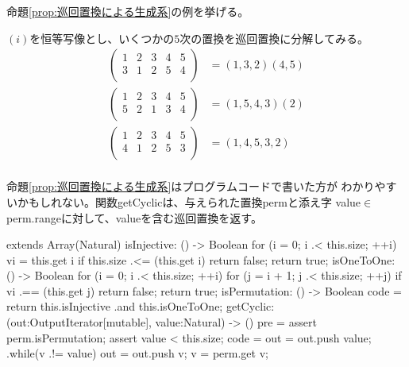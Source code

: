	命題\ref{prop:巡回置換による生成系}の例を挙げる。

	\begin{example}[巡回置換による分解の例]\label{eg:巡回置換による分解の例} %
		$(i)$を恒等写像とし、いくつかの$5$次の置換を巡回置換に分解してみる。
		\begin{equation*}\begin{split} %
			\begin{pmatrix}
				1 & 2 & 3 & 4 & 5 \\
				3 & 1 & 2 & 5 & 4 \\
			\end{pmatrix} &= (1,3,2)(4,5) \\
			\begin{pmatrix}
				1 & 2 & 3 & 4 & 5 \\
				5 & 2 & 1 & 3 & 4 \\
			\end{pmatrix} &= (1,5,4,3)(2) \\
			\begin{pmatrix}
				1 & 2 & 3 & 4 & 5 \\
				4 & 1 & 2 & 5 & 3 \\
			\end{pmatrix} &= (1,4,5,3,2) \\
		\end{split}\end{equation*} %
	\end{example} %

	命題\ref{prop:巡回置換による生成系}はプログラムコードで書いた方が
	わかりやすいかもしれない。関数getCyclicは、与えられた置換permと添え字
	value$\in$perm.rangeに対して、valueを含む巡回置換を返す。
	\begin{cprog}
	extends Array(Natural) {
		isInjective: () -> Boolean {
			for (i = 0; i .< this.size; ++i) {
				vi = this.get i
				if this.size .<= (this.get i) {
					return false;
				}
			}
			return true;
		}
		isOneToOne: () -> Boolean {
			for (i = 0; i .< this.size; ++i) {
				for (j = i + 1; j .< this.size; ++j) {
					if vi .== (this.get j) {
						return false;
					}
				}
			}
			return true;
		}
		isPermutation: () -> Boolean {
			code = {
				return this.isInjective .and  this.isOneToOne;
			}
		}
		getCyclic: (out:OutputIterator[mutable], value:Natural) -> () {
			pre = {
				assert perm.isPermutation;
				assert value < this.size;
			}
			code = {
				out = out.push value;
				.while(v .!= value) {
					out = out.push v;
					v = perm.get v;
				}
			}
		}
	}
	\end{cprog}

